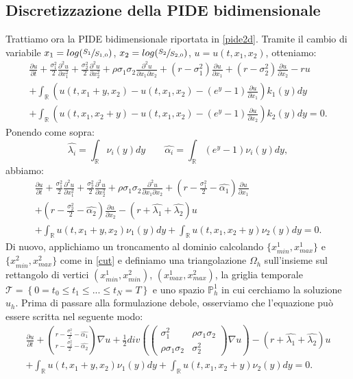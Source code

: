 \documentclass[a4paper,10pt]{report}
\newcommand{\der}[2]{\frac{\partial #1}{\partial #2}}
\newcommand{\dder}[2]{\frac{\partial^2 #1}{\partial #2^2}}
\newcommand{\dmix}[3]{\frac{\partial^2 #1}{\partial #2 \partial #3}}
\theoremstyle{plain}
\theoremstyle{definition}
\theoremstyle{remark}
\begin{document}
\subsection{Discretizzazione della PIDE bidimensionale}
Trattiamo ora la PIDE bidimensionale riportata in \ref{pide2d}. Tramite il cambio di variabile $x_1=log(\sfrac{S_1}{S_{1,0}})$, $x_2=log(\sfrac{S_2}{S_{2,0}})$, $u=u(t, x_1, x_2)$, otteniamo:
\begin{multline}
\der{u}{t}+\frac{\sigma_1^2}{2}\dder{u}{x_1}+\frac{\sigma_2^2}{2}\dder{u}{x_2}+\rho\sigma_1\sigma_2\dmix{u}{x_1}{x_2}+
\left(r-\sigma_1^2\right)\der{u}{x_1}+
\left(r-\sigma_2^2\right)\der{u}{x_2}-ru\\
+\int_\mathbb{R}\left( u(t,x_1+y,x_2)-u(t,x_1,x_2)-(e^y-1)\der{u}{x_1}\right)k_1(y)dy\\
+\int_\mathbb{R}\left( u(t,x_1,x_2+y)-u(t,x_1,x_2)-(e^y-1)\der{u}{x_2}\right)k_2(y)dy=0.
\label{pide2dcostcoeff}
\end{multline}
Ponendo come sopra:$$\hat{\lambda_i}=\int_\mathbb{R}\nu_i(y)dy \qquad \hat{\alpha_i}=\int_\mathbb{R}(e^y-1)\nu_i(y)dy,$$abbiamo:
\begin{multline}
\der{u}{t}+\frac{\sigma_1^2}{2}\dder{u}{x_1}+\frac{\sigma_2^2}{2}\dder{u}{x_2}+\rho\sigma_1\sigma_2\dmix{u}{x_1}{x_2}+
\left(r-\frac{\sigma_1^2}{2}-\hat{\alpha_1}\right)\der{u}{x_1}\\+
\left(r-\frac{\sigma_2^2}{2}-\hat{\alpha_2}\right)\der{u}{x_2}-(r+\hat{\lambda_1}+\hat{\lambda_2})u\\+
\int_\mathbb{R}u(t,x_1+y,x_2)\nu_1(y)dy+
\int_\mathbb{R}u(t,x_1,x_2+y)\nu_2(y)dy=0.
\label{pide2dcostcoeff2}
\end{multline}
Di nuovo, applichiamo un troncamento al dominio calcolando $\{x_{min}^1, x_{max}^1\}$ e $\{x_{min}^2, x_{max}^2\}$ come in \ref{cut} e definiamo una triangolazione $\Omega_h$ sull'insieme sul rettangolo di vertici $(x_{min}^1, x_{min}^2)$, $(x_{max}^1, x_{max}^2)$, la griglia temporale $\mathcal{T}=\left\{0= t_0\leq t_1\leq ... \leq t_N=T\right\}$ e uno spazio $\mathbb{P}_h^1$ in cui cerchiamo la soluzione $u_h$.
Prima di passare alla formulazione debole, osserviamo che l'equazione pu\`o essere scritta nel seguente modo:
\begin{multline}
\der{u}{t}+\binom{r-\frac{\sigma_1^2}{2}-\hat{\alpha_1}}{r-\frac{\sigma_2^2}{2}-\hat{\alpha_2}}\nabla u+\frac{1}{2}div\left(\left(\begin{matrix}\sigma_1^2 & \rho\sigma_1\sigma_2\\ \rho\sigma_1\sigma_2 & \sigma_2^2 \end{matrix}\right)\nabla u\right)-(r+\hat{\lambda_1}+\hat{\lambda_2})u\\
+\int_\mathbb{R}u(t,x_1+y,x_2)\nu_1(y)dy+
\int_\mathbb{R}u(t,x_1,x_2+y)\nu_2(y)dy=0.
\end{multline}
\end{document}
